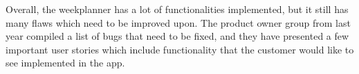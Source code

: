 Overall, the weekplanner has a lot of functionalities implemented, but it still has many flaws which need to be improved upon.
The product owner group from last year compiled a list of bugs that need to be fixed, and they have presented a few important user stories which include functionality that the customer would like to see implemented in the app.